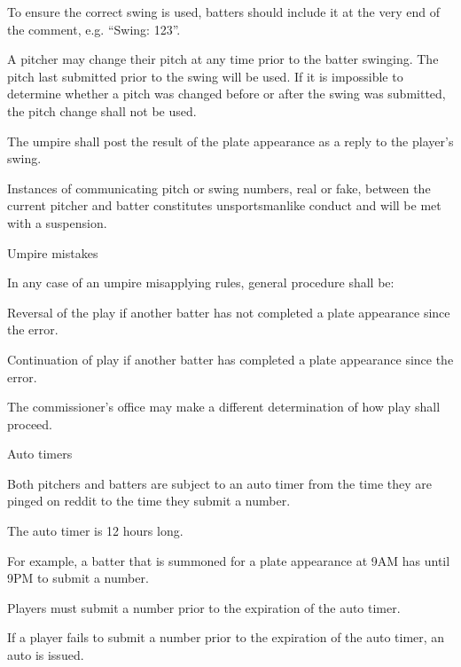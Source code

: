\begin{deepEnumerate}
\begin{deepEnumerate}
\begin{deepEnumerate}
			To ensure the correct swing is used, batters should include it at the very end of the comment, 
			e.g. “Swing: 123”.
			\item A pitcher may change their pitch at any time prior to the batter swinging. The pitch last submitted prior to the swing will be used.
			If it is impossible to determine whether a pitch was changed before or after the swing was submitted, the pitch change shall not be used.
		\end{deepEnumerate}
		\item The umpire shall post the result of the plate appearance as a reply to the player's swing.
		\item Instances of communicating pitch or swing numbers, real or fake, 
		between the current pitcher and batter constitutes unsportsmanlike conduct and will be met with a suspension.
		\item Umpire mistakes
		\begin{deepEnumerate}
			\item In any case of an umpire misapplying rules, general procedure shall be:
			\begin{deepEnumerate}
				\item Reversal of the play if another batter has not completed a plate appearance since the error.
				\item Continuation of play if another batter has completed a plate appearance since the error.
			\end{deepEnumerate}
			\item The commissioner's office may make a different determination of how play shall proceed.
		\end{deepEnumerate}
	\end{deepEnumerate}
	\item Auto timers
	\begin{deepEnumerate}
		\item Both pitchers and batters are subject to an auto timer from the time they are pinged on reddit to the time they submit a number.
		\item The auto timer is 12 hours long.
		\begin{deepEnumerate}
			\item For example, a batter that is summoned for a plate appearance at 9AM has until 9PM to submit a number.
		\end{deepEnumerate}
		\item Players must submit a number prior to the expiration of the auto timer.
		\item If a player fails to submit a number prior to the expiration of the auto timer, an auto is issued.

\end{deepEnumerate}
\end{deepEnumerate}

